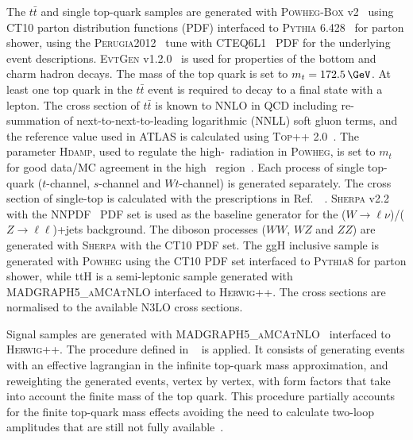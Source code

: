  
The $t\bar{t}$ and single top-quark samples are generated
with \textsc{Powheg-Box} v2~\cite{Frixione:2007vw} using \textsc{CT10} parton distribution functions (PDF)
interfaced to \textsc{Pythia} 6.428~\cite{Sjostrand:2006za} for parton shower,
using the \textsc{Perugia2012}~\cite{Skands:2010ak} tune with
CTEQ6L1~\cite{Pumplin:2002vw} PDF for the underlying event descriptions.
\textsc{EvtGen} v1.2.0~\cite{Lange:2001uf} is used for properties of the bottom
and charm hadron decays. The mass of the top quark is set to $m_{t} =
172.5\,\GeV$. At least one top quark in the $t\bar{t}$ event is required to
decay to a final state with a lepton. The cross section of $t\bar{t}$ is 
known to NNLO in QCD
including re-summation of next-to-next-to-leading logarithmic (NNLL) soft gluon
terms, and the reference value used in ATLAS is calculated using \textsc{Top++}
2.0~\cite{Czakon:2011xx}. The parameter \textsc{Hdamp}, used to regulate the
high-\pt\ radiation in \textsc{Powheg}, is set to $m_{t}$ for good data/MC
agreement in the high \pt\ region~\cite{ATL-PHYS-PUB-2014-005}. Each process of
single top-quark ($t$-channel, $s$-channel and $Wt$-channel) is generated separately. The cross
section of single-top is calculated with the prescriptions in
Ref.~~\cite{Kidonakis:2011wy, Kidonakis:2010ux}. 
\textsc{Sherpa} v2.2~\cite{Gleisberg:2008ta} with the
\textsc{NNPDF}~\cite{Lai:2010vv} PDF set is used as the baseline
generator for the ($W \to \ell\nu$)/($Z\to \ell\ell$)+jets background.
The diboson processes ($WW$,
$WZ$ and $ZZ$) are generated with \textsc{Sherpa} with the \textsc{CT10} PDF
set.  The ggH inclusive sample is generated with \textsc{Powheg} using
the \textsc{CT10} PDF set interfaced to \textsc{Pythia8} for parton
shower, while ttH is a semi-leptonic sample generated with
\textsc{MADGRAPH5\_aMCAtNLO} interfaced to \textsc{Herwig++}. The cross
sections are normalised to the available N3LO cross sections.

Signal samples are
generated with \textsc{MADGRAPH5\_aMCAtNLO}~\cite{Alwall:2014hca} interfaced to
\textsc{Herwig++}. The procedure defined in ~\cite{CP3Paper} is applied. 
It consists of generating events with an effective
lagrangian in the infinite top-quark mass approximation, and  reweighting the
generated events, vertex by vertex,  with form factors that take into
account the finite mass of the top quark.  This procedure partially
accounts for the finite top-quark mass effects avoiding the need to
calculate two-loop amplitudes that are still not fully 
available~\cite{Degrassi_Ramona}.



